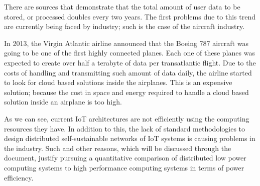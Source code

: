 There are sources that demonstrate that the total amount of user data to be
stored, or processed doubles every two years. The first problems due to this
trend are currently being faced by industry; such is the case of the aircraft
industry.

In 2013, the Virgin Atlantic airline announced that the Boeing 787 aircraft was
going to be one of the first highly connected planes. Each one of these planes
was expected to create over half a terabyte of data per transatlantic flight.
Due to the costs of handling and transmitting such amount of data daily, the
airline started to look for cloud based solutions inside the airplanes. This is
an expensive solution; because the cost in space and energy required to handle
a cloud based solution inside an airplane is too high.

As we can see, current IoT architectures are not efficiently using the
computing resources they have. In addition to this, the lack of standard
methodologies to design distributed self-sustainable networks of IoT systems is
causing problems in the industry. Such and other reasons, which will be
discussed through the document, justify pursuing a quantitative comparison of
distributed low power computing systems to high performance computing systems
in terms of power efficiency. 

\clearpage
